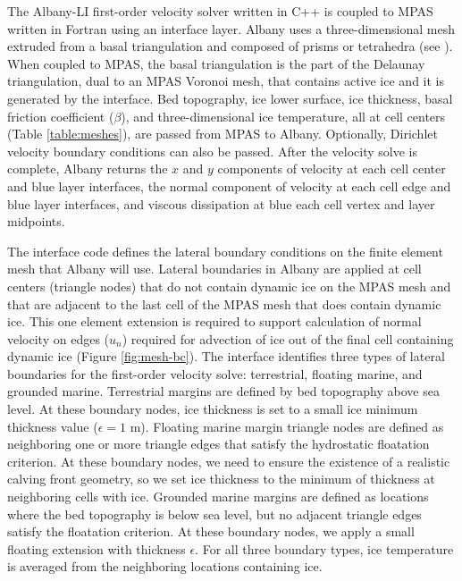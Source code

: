 The Albany-LI first-order velocity solver written in C++ is coupled to MPAS written in Fortran using an interface layer.
Albany uses a three-dimensional mesh extruded from a basal triangulation and composed of prisms or tetrahedra (see \cite{tezaur2015a}). 
When coupled to MPAS, the basal triangulation is the part of the Delaunay triangulation, dual to an MPAS Voronoi mesh, that contains active ice and it is generated by the interface.
Bed topography, ice lower surface, ice thickness, basal friction coefficient ($\beta$), and three-dimensional ice temperature,
all at cell centers (Table \ref{table:meshes}), are passed from MPAS to Albany.
Optionally, Dirichlet velocity boundary conditions can also be passed.
After the velocity solve is complete, Albany returns the $x$ and $y$ components of velocity at each cell center and blue layer interfaces, the normal component of velocity at each cell edge and blue layer interfaces, and viscous dissipation at blue each cell vertex and layer midpoints.

The interface code defines the lateral boundary conditions on the finite element mesh that Albany will use.
Lateral boundaries in Albany are applied at cell centers (triangle nodes) that do not contain dynamic ice on the MPAS mesh and that are adjacent to the last cell of the MPAS mesh that does contain dynamic ice.
This one element extension is required to support calculation of normal velocity on edges ($u_n$) required for advection 
of ice out of the final cell containing dynamic ice (Figure \ref{fig:mesh-bc}).
The interface identifies three types of lateral boundaries for the first-order velocity solve: terrestrial, floating marine, and grounded marine.
Terrestrial margins are defined by bed topography above sea level.  
At these boundary nodes, ice thickness is set to a small ice minimum thickness value ($\epsilon=1$ m).
Floating marine margin triangle nodes are defined as neighboring one or more triangle edges that satisfy the hydrostatic floatation criterion.
At these boundary nodes, we need to ensure the existence of a realistic calving front geometry, 
so we set ice thickness to the minimum of thickness at neighboring cells with ice.
Grounded marine margins are defined as locations where the bed topography is below sea level, 
but no adjacent triangle edges satisfy the floatation criterion.
At these boundary nodes, we apply a small floating extension with thickness $\epsilon$.
For all three boundary types, ice temperature is averaged from the neighboring locations containing ice.


